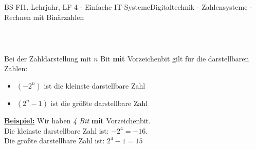 \documentclass[11pt,twocolumn,oneside,openany,headings=optiontotoc,11pt,numbers=noenddot]{article}
\begin{document}
\begin{worksheet}{BS FI}{1. Lehrjahr, LF 4 - Einfache IT-Systeme}{Digitaltechnik - Zahlensysteme - Rechnen mit Binärzahlen}
\begin{tabularx}{0.48\textwidth}{c|lll||rrr|c}
		\end{tabularx}\\
		\par\noindent
		\begin{framed}
			\noindent
			Bei der Zahldarstellung mit \(n\) Bit \textbf{mit} Vorzeichenbit gilt für die darstellbaren Zahlen:
			\begin{itemize}
				\item[] \((-2^n)\) ist die kleinste darstellbare Zahl
				\item[] \((2^n-1)\) ist die größte darstellbare Zahl
			\end{itemize}
		\end{framed}
		\par\noindent
		\textbf{\underline{Beispiel:}} Wir haben \textit{4 Bit} \textbf{mit} Vorzeichenbit.\\
		Die kleinste darstellbare Zahl ist: \(-2^4 = -16\).\\
		Die größte darstellbare Zahl ist: \(2^4-1 = 15\)
	\end{worksheet}
\end{document}
